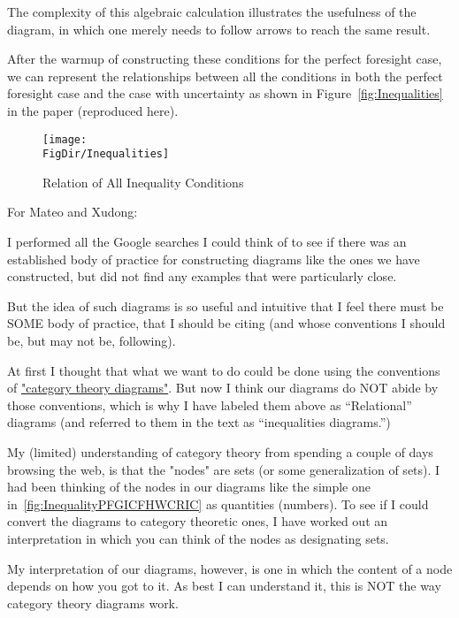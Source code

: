 \documentclass[\econtexRoot/BufferStockTheory]{subfiles}
\begin{document}
The complexity of this algebraic calculation illustrates the usefulness of the diagram, in which one merely needs to follow arrows to reach the same result.

After the warmup of constructing these conditions for the perfect foresight case, we can represent the relationships between all the conditions in both the perfect foresight case and the case with uncertainty as shown in Figure~\ref{fig:Inequalities} in the paper (reproduced here).

\begin{figure}[h]
  \centerline{
    \texttt{[image: \\FigDir/Inequalities]}
  }
  \caption{Relation of All Inequality Conditions} \label{fig:InequalitiesApp}
\end{figure}

\begin{CDCPrivate}
  \pagebreak


  For Mateo and Xudong:
  
  I performed all the Google searches I could think of to see if there was an established body of practice for constructing diagrams like the ones we have constructed, but did not find any examples that were particularly close.  

  But the idea of such diagrams is so useful and intuitive that I feel there must be SOME body of practice, that I should be citing (and whose conventions I should be, but may not be, following).

  At first I thought that what we want to do could be done using the conventions of \href{https://mathematica.stackexchange.com/questions/8654/creating-diagrams-for-category-theory}{"category theory diagrams"}. But now I think our diagrams do NOT abide by those conventions, which is why I have labeled them above as ``Relational'' diagrams (and referred to them in the text as ``inequalities diagrams.'')

  My (limited) understanding of category theory from spending a couple of days browsing the web, is that the "nodes" are sets (or some generalization of sets). I had been thinking of the nodes in our diagrams like the simple one in~\ref{fig:InequalityPFGICFHWCRIC} as quantities (numbers).  To see if I could convert the diagrams to category theoretic ones, I have worked out an interpretation in which you can think of the nodes as designating sets.

  My interpretation of our diagrams, however, is one in which the content of a node depends on how you got to it. As best I can understand it, this is NOT the way category theory diagrams work.


\end{CDCPrivate}
\end{document}
